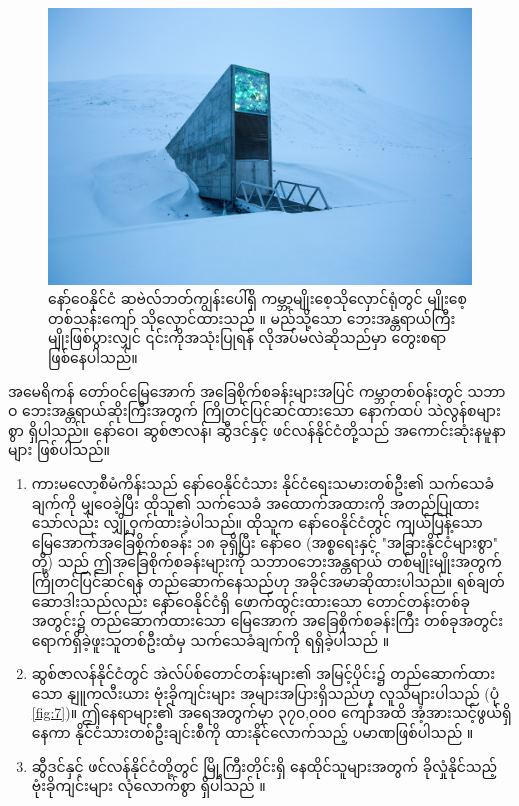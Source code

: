 \documentclass[10pt,twocolumn,letterpaper]{article}
\begin{document}
\begin{figure}[t]
\begin{center}
   \includegraphics[width=1\linewidth]{svalbard.jpg}
\end{center}
   \caption{နော်ဝေနိုင်ငံ ဆဗဲလ်ဘတ်ကျွန်းပေါ်ရှိ ကမ္ဘာ့မျိုးစေ့သိုလှောင်ရုံတွင် မျိုးစေ့တစ်သန်းကျော် သိုလှောင်ထားသည် \cite{24}။ မည်သို့သော ဘေးအန္တရာယ်ကြီးမျိုးဖြစ်ပွားလျှင် ၎င်းကိုအသုံးပြုရန် လိုအပ်မလဲဆိုသည်မှာ တွေးစရာ ဖြစ်နေပါသည်။}
\label{fig:8}
\label{fig:onecol}
\end{figure}

အမေရိကန် တော်ဝင်မြေအောက် အခြေစိုက်စခန်းများအပြင် ကမ္ဘာတစ်ဝန်းတွင် သဘာဝ ဘေးအန္တရာယ်ဆိုးကြီးအတွက် ကြိုတင်ပြင်ဆင်ထားသော နောက်ထပ် သဲလွန်စများစွာ ရှိပါသည်။ နော်ဝေ၊ ဆွစ်ဇာလန်၊ ဆွီဒင်နှင့် ဖင်လန်နိုင်ငံတို့သည် အကောင်းဆုံးနမူနာများ ဖြစ်ပါသည်။

\begin{flushleft}
\begin{enumerate}
    \item ကားမလော့စီမံကိန်းသည် နော်ဝေနိုင်ငံသား နိုင်ငံရေးသမားတစ်ဦး၏ သက်သေခံချက်ကို မျှဝေခဲ့ပြီး \cite{25,26} ထိုသူ၏ သက်သေခံ အထောက်အထားကို အတည်ပြုထားသော်လည်း လျှို့ဝှက်ထားခဲ့ပါသည်။ ထိုသူက နော်ဝေနိုင်ငံတွင် ကျယ်ပြန့်သော မြေအောက်အခြေစိုက်စခန်း ၁၈ ခုရှိပြီး နော်ဝေ (အစ္စရေးနှင့် "အခြားနိုင်ငံများစွာ" တို့) သည် ဤအခြေစိုက်စခန်းများကို သဘာဝဘေးအန္တရာယ် တစ်မျိုးမျိုးအတွက် ကြိုတင်ပြင်ဆင်ရန် တည်ဆောက်နေသည်ဟု အခိုင်အမာဆိုထားပါသည်။ ရစ်ချတ်ဆောဒါးသည်လည်း နော်ဝေနိုင်ငံရှိ ဖောက်ထွင်းထားသော တောင်တန်းတစ်ခုအတွင်း၌ တည်ဆောက်ထားသော မြေအောက် အခြေစိုက်စခန်းကြီး တစ်ခုအတွင်း ရောက်ရှိခဲ့ဖူးသူတစ်ဦးထံမှ သက်သေခံချက်ကို ရရှိခဲ့ပါသည် \cite{22}။
    \item ဆွစ်ဇာလန်နိုင်ငံတွင် အဲလ်ပ်စ်တောင်တန်းများ၏ အမြင့်ပိုင်း၌ တည်ဆောက်ထားသော နျူကလီးယား ဗုံးခိုကျင်းများ အများအပြားရှိသည်ဟု လူသိများပါသည် (ပုံ \ref{fig:7})။ ဤနေရာများ၏ အရေအတွက်မှာ ၃၇၀,၀၀၀ ကျော်အထိ အံ့အားသင့်ဖွယ်ရှိနေကာ နိုင်ငံသားတစ်ဦးချင်းစီကို ထားနိုင်လောက်သည့် ပမာဏဖြစ်ပါသည် \cite{27}။
    \item ဆွီဒင်နှင့် ဖင်လန်နိုင်ငံတို့တွင် မြို့ကြီးတိုင်းရှိ နေထိုင်သူများအတွက် ခိုလှုံနိုင်သည့် ဗုံးခိုကျင်းများ လုံလောက်စွာ ရှိပါသည် \cite{27}။
\end{enumerate}
\end{flushleft}
\end{document}
